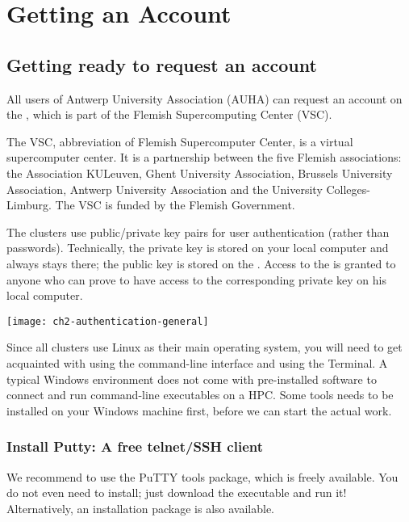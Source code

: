 \chapter{Getting an \hpc Account}
\label{ch:getting-a-hpc-account}

\section{Getting ready to request an account}
\label{sec:getting-ready-to-request-an-account}

All users of Antwerp University Association (AUHA) can request an account on
the \hpc, which is part of the Flemish Supercomputing Center (VSC).

The VSC, abbreviation of Flemish Supercomputer Center, is a virtual
supercomputer center. It is a partnership between the five Flemish
associations: the Association KULeuven,  Ghent University Association, Brussels
University Association, Antwerp University Association and the University
Colleges-Limburg. The VSC is funded by the Flemish Government.

The \hpc clusters use public/private key pairs for user authentication
(rather than passwords). Technically, the private key is stored on your local
computer and always stays there; the public key is stored on the \hpc.
Access to the \hpc is granted to anyone who can prove to have access to the
corresponding private key on his local computer.

\texttt{[image: ch2-authentication-general]}

\ifwindows

  Since all \hpc clusters use Linux as their main operating system, you will
  need to get acquainted with using the command-line interface and using the
  Terminal. A typical Windows environment does not come with pre-installed
  software to connect and run command-line executables on a HPC. Some tools
  needs to be installed on your Windows machine first, before we can start the
  actual work.

  \subsection{Install Putty: A free telnet/SSH client}
  \label{sec:install-putty}

  We recommend to use the PuTTY tools package, which is freely available. You
  do not even need to install; just download the executable and run it!
  Alternatively, an installation package is also available.

